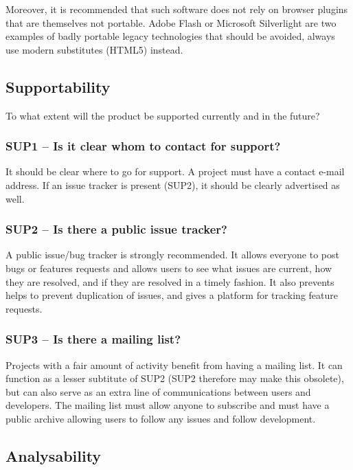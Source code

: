 \documentclass[a4paper,11pt]{article}
\begin{document}
Moreover, it is recommended that such software does not rely on browser plugins that
are themselves not portable. Adobe Flash or Microsoft Silverlight are two
examples of badly portable legacy technologies that should be avoided, always use
modern substitutes (HTML5) instead.

\subsection{Supportability}

To what extent will the product be supported currently and in the future?

\subsubsection{SUP1 -- Is it clear whom to contact for support?}

It should be clear where to go for support. A project must have a contact
e-mail address. If an issue tracker is present (SUP2), it should be clearly advertised
as well.

\subsubsection{SUP2 -- Is there a public issue tracker?}

A public issue/bug tracker is strongly recommended. It allows everyone to post
bugs or features requests and allows users to see what issues are current, how
they are resolved, and if they are resolved in a timely fashion. It also
prevents helps to prevent duplication of issues, and gives a platform for
tracking feature requests.

\subsubsection{SUP3 -- Is there a mailing list?}

Projects with a fair amount of activity benefit from having a mailing list. It
can function as a lesser subtitute of SUP2 (SUP2 therefore may make this
obsolete), but can also serve as an extra line of communications between users
and developers. The mailing list must allow anyone to subscribe and must have a
public archive allowing users to follow any issues and follow development.

\subsection{Analysability}
\end{document}
